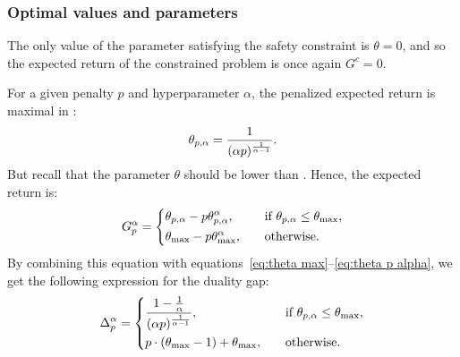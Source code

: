 \subsubsection{Optimal values and parameters}
The only value of the parameter satisfying the safety constraint is $\theta = 0$, and so the expected return of the constrained problem is once again $G^c = 0$.\par
For a given penalty $p$ and hyperparameter $\alpha$, the penalized expected return is maximal in :
\begin{equation}
	\theta_{p, \alpha} = \frac{1}{(\alpha p)^\frac{1}{\alpha - 1}}.\label{eq:theta p alpha}
\end{equation}
But recall that the parameter $\theta$ should be lower than \thetamax. Hence, the expected return is:
\begin{equation*}
	G_p^\alpha = \begin{dcases}
		\theta_{p, \alpha} - p \theta_{p, \alpha}^\alpha,&\quad\text{if}~\theta_{p, \alpha}\leq\theta_\text{max},\\
		\theta_\text{max} - p \theta_\text{max}^\alpha,&\quad\text{otherwise}.
	\end{dcases}
\end{equation*}
By combining this equation with equations~\eqref{eq:theta max}--\eqref{eq:theta p alpha}, we get the following expression for the duality gap:
\begin{equation}
	\Delta_p^\alpha = \begin{dcases}
	\frac{1 - \frac{1}{\alpha}}{(\alpha p)^\frac{1}{\alpha - 1}}, &\quad\text{if}~\theta_{p, \alpha}\leq\theta_\text{max},\\
	p\cdot(\theta_\text{max} - 1) + \theta_\text{max},&\quad\text{otherwise}.
	\end{dcases} \label{eq:duality gap}
\end{equation}


